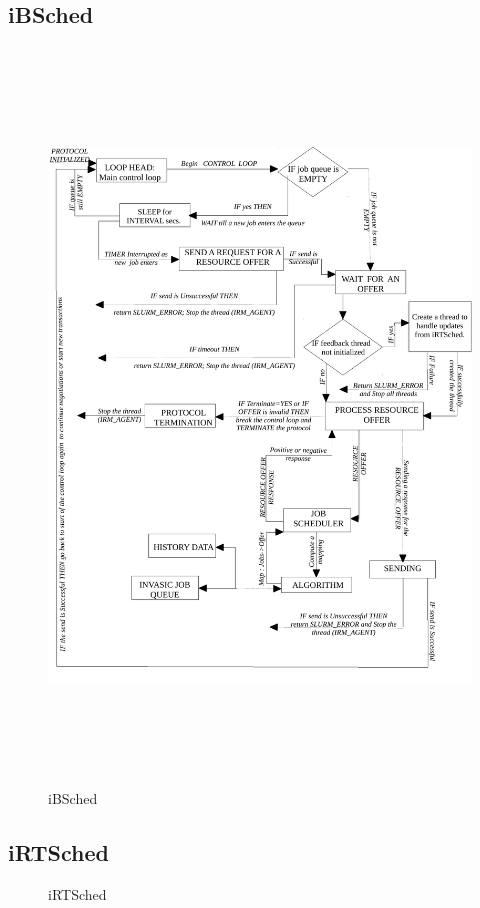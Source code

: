 \subsection{iBSched}
\begin{figure}[!t]
\hspace*{0.1in}
\centering
\includegraphics[width=1.0\textwidth, height=195mm]{./figures/iBSched.pdf}
\caption{iBSched}
\label{fig:Neg}
\end{figure}
\subsection{iRTSched}
\begin{figure}[!htbp]
\centering
\caption{iRTSched}
\label{fig:Neg}
\end{figure}
